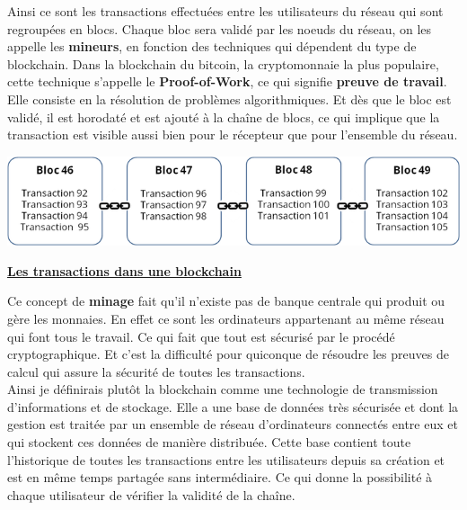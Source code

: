 \documentclass[12pt]{report}
\begin{document}
\hspace{1cm} Ainsi ce sont les transactions effectuées entre les utilisateurs du réseau qui sont regroupées en blocs. Chaque bloc sera validé par les noeuds du réseau, on les appelle les \textbf{mineurs},  en fonction des techniques qui dépendent du type de blockchain. Dans la blockchain du bitcoin, la cryptomonnaie la plus populaire, cette technique s'appelle le \textbf{Proof-of-Work}, ce qui signifie \textbf{preuve de travail}. Elle consiste en la résolution de problèmes algorithmiques. Et dès que le bloc est validé, il est horodaté et est ajouté à la chaîne de blocs, ce qui implique que la transaction est visible aussi bien pour le récepteur que pour l'ensemble du réseau.

\begin{center}
    \includegraphics[width=1\textwidth]{block_schema}

    \textbf{\underline{Les transactions dans une blockchain}} \\[1cm]
\end{center}

\hspace{1cm} Ce concept de \textbf{minage} fait qu'il n'existe pas de banque centrale qui produit ou gère les monnaies. En effet ce sont les ordinateurs  appartenant au même réseau qui font tous le travail. Ce qui fait que tout est sécurisé par le procédé cryptographique. Et c'est la difficulté pour quiconque de résoudre les preuves de calcul qui assure la sécurité de toutes les transactions.\\

\hspace{1cm} Ainsi je définirais plutôt la blockchain comme une technologie de transmission d'informations et de stockage. Elle a une base de données très sécurisée et dont la gestion est traitée par un ensemble de réseau d'ordinateurs connectés entre eux et qui stockent ces données de manière distribuée. Cette base contient toute l'historique de toutes les transactions entre les utilisateurs depuis sa création et est en même temps partagée sans intermédiaire. Ce qui donne la possibilité à chaque utilisateur de vérifier la validité de la chaîne.
\end{document}
